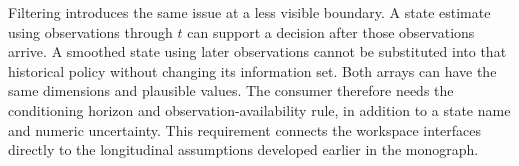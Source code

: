 Filtering introduces the same issue at a less visible boundary. A state
estimate using observations through $t$ can support a decision after those
observations arrive. A smoothed state using later observations cannot be
substituted into that historical policy without changing its information
set. Both arrays can have the same dimensions and plausible values. The
consumer therefore needs the conditioning horizon and observation-availability
rule, in addition to a state name and numeric uncertainty. This requirement
connects the workspace interfaces directly to the longitudinal assumptions
developed earlier in the monograph.
